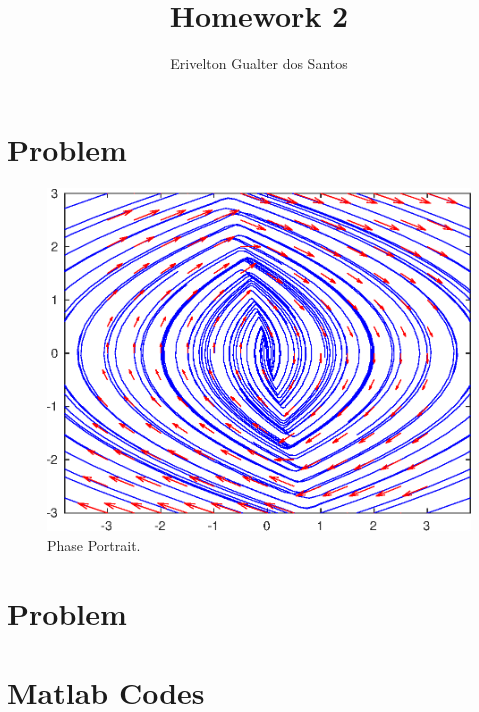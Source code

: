 \documentclass[a4paper,10pt]{article}
\title{Homework 2}
\author{Erivelton Gualter dos Santos}
\begin{document}
\date{}
\maketitle

\section{Problem}

\begin{figure}[H]
  \centering
  \includegraphics[width=.8\linewidth]{question1.eps}
  \caption{Phase Portrait.} \label{fig:q3}
\end{figure}

\section{Problem}



\section{Matlab Codes}


\end{document}

